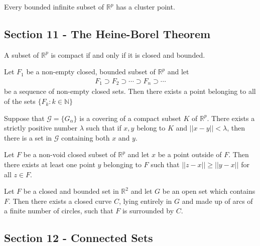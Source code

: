 \documentclass[12pt]{article}
\newcommand{\N}{\mathbb{N}}
\newcommand{\R}{\mathbb{R}}
\newenvironment{theorem}[2][Theorem]{\begin{trivlist}
\item[\hskip \labelsep {\bfseries #1}\hskip \labelsep {\bfseries #2.}]}{\end{trivlist}}
\begin{document}
\begin{theorem}[Bolzano-Weierstrass]{Theorem}
Every bounded infinite subset of $\mathbb{R}^p$ has a cluster point.
\end{theorem}

\subsection*{Section 11 - The Heine-Borel Theorem}

\begin{theorem}[Heine-Borel]{Theorem}
A subset of $\mathbb{R}^p$ is compact if and only if it is closed and bounded.
\end{theorem}

\begin{theorem}[Cantor Intersection]{Theorem}
Let $F_1$ be a non-empty closed, bounded subset of $\mathbb{R}^p$ and let
\begin{align*}
F_1 \supset F_2 \supset \cdots \supset F_n \supset \cdots
\end{align*}
be a sequence of non-empty closed sets. Then there exists a point belonging to all of the sets $\{F_k: k \in \N\}$
\end{theorem}

\begin{theorem}[Lebesgue Covering]{Theorem}
Suppose that $\mathscr{G} = \{G_{\alpha}\}$ is a covering of a compact subset $K$ of $\R^p$. There exists a strictly positive number $\lambda$ such that if $x, y$ belong to $K$ and $||x - y|| < \lambda$, then there is a set in $\mathscr{G}$ containing both $x$ and $y$.
\end{theorem}

\begin{theorem}[Nearest Point]{Theorem}
Let $F$ be a non-void closed subset of $\mathbb{R}^p$ and let $x$ be a point outside of $F$. Then there exists at least one point $y$ belonging to $F$ such that $||z - x|| \geq ||y - x||$ for all $z \in F$.
\end{theorem}

\begin{theorem}[Circumscribing]{Theorem}
Let $F$ be a closed and bounded set in $\mathbb{R}^2$ and let $G$ be an open set which contains $F$. Then there exists a closed curve $C$, lying entirely in $G$ and made up of arcs of a finite number of circles, such that $F$ is surrounded by $C$.
\end{theorem}

\subsection*{Section 12 - Connected Sets}
\end{document}
